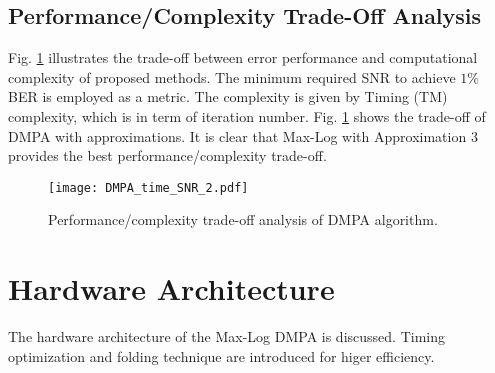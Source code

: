 \documentclass[journal,twoside]{IEEEtran}
\begin{document}
\subsection{Performance/Complexity Trade-Off Analysis}
Fig. \ref{fig:tradeoff} illustrates the trade-off between error performance and computational complexity of proposed methods. The minimum required SNR to achieve $1\%$ BER is employed as a metric. The complexity is given by Timing (TM) complexity, which is in term of iteration number. Fig. \ref{fig:tradeoff} shows the trade-off of DMPA with approximations. It is clear that Max-Log with Approximation $3$ provides the best performance/complexity trade-off.
\begin{figure}[htbp]
\centering
\texttt{[image: DMPA\_time\_SNR\_2.pdf]}
\caption{Performance/complexity trade-off analysis of DMPA algorithm.}
\label{fig:tradeoff}
\end{figure}



\section{Hardware Architecture}\label{sec:Hardware}
The hardware architecture of the Max-Log DMPA is discussed. Timing optimization and folding technique are introduced for higer efficiency.
\end{document}
